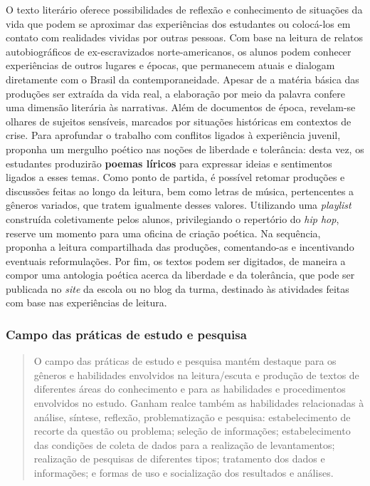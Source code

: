 \documentclass[11pt]{extarticle}
\begin{document}
\begin{enumerate}
O texto literário oferece possibilidades de reflexão e conhecimento de
situações da vida que podem se aproximar das experiências dos
estudantes ou colocá-los em contato com realidades vividas por outras
pessoas. Com base na leitura de relatos autobiográficos de
ex-escravizados norte-americanos, os alunos podem conhecer
experiências de outros lugares e épocas, que permanecem atuais e
dialogam diretamente com o Brasil da contemporaneidade. Apesar de a
matéria básica das produções ser extraída da vida real, a elaboração
por meio da palavra confere uma dimensão literária às narrativas. Além
de documentos de época, revelam-se olhares de sujeitos sensíveis,
marcados por situações históricas em contextos de crise. Para
aprofundar o trabalho com conflitos ligados à experiência juvenil,
proponha um mergulho poético nas noções de liberdade e tolerância:
desta vez, os estudantes produzirão \textbf{poemas líricos} para
expressar ideias e sentimentos ligados a esses temas. Como ponto de
partida, é possível retomar produções e discussões feitas ao longo da
leitura, bem como letras de música, pertencentes a gêneros variados,
que tratem igualmente desses valores. Utilizando uma \emph{playlist}
construída coletivamente pelos alunos, privilegiando o repertório do
\emph{hip hop}, reserve um momento para uma oficina de criação
poética. Na sequência, proponha a leitura compartilhada das produções,
comentando-as e incentivando eventuais reformulações. Por fim, os
textos podem ser digitados, de maneira a compor uma antologia poética
acerca da liberdade e da tolerância, que pode ser publicada no
\emph{site} da escola ou no blog da turma, destinado às atividades
feitas com base nas experiências de leitura.

\subsubsection{Campo das práticas de estudo e pesquisa}

\begin{quote}
O campo das práticas de estudo e pesquisa mantém destaque para os
gêneros e habilidades envolvidos na leitura/escuta e produção de textos
de diferentes áreas do conhecimento e para as habilidades e
procedimentos envolvidos no estudo. Ganham realce também as habilidades
relacionadas à análise, síntese, reflexão, problematização e pesquisa:
estabelecimento de recorte da questão ou problema; seleção de
informações; estabelecimento das condições de coleta de dados para a
realização de levantamentos; realização de pesquisas de diferentes
tipos; tratamento dos dados e informações; e formas de uso e
socialização dos resultados e análises.


\end{quote}
\end{enumerate}
\end{document}
